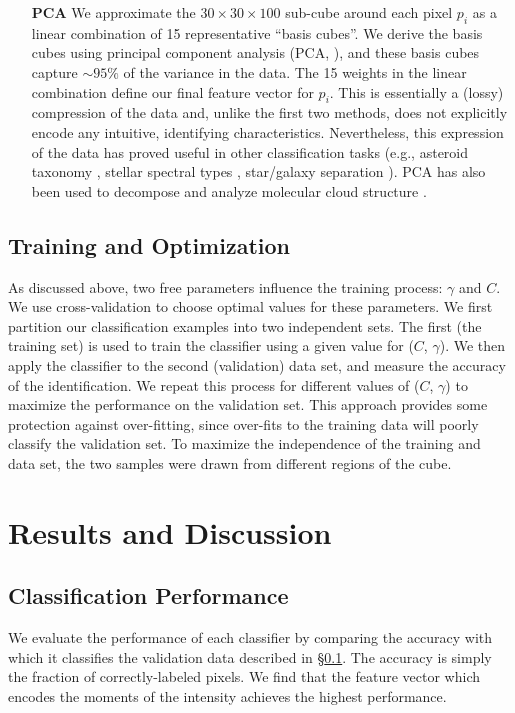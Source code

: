 \begin{enumerate}
\item[\textbf{PCA}] We approximate the $30\times30\times100$ sub-cube around each pixel $p_i$ as a linear combination of 15 representative ``basis cubes''. We derive the basis cubes using principal component analysis (PCA, \citealt{Francis99}), and these basis cubes capture $\sim 95\%$ of the variance in the data. The 15 weights in the linear combination define our final feature vector for $p_i$. This is essentially a (lossy) compression of the data and, unlike the first two methods, does not explicitly encode any intuitive, identifying characteristics. Nevertheless, this expression of the data has proved useful in other classification tasks (e.g., asteroid taxonomy \citep{Tholen84}, stellar spectral types \citep{Singh98}, star/galaxy separation \citep{Cabanac02}). PCA has also been used to decompose and analyze molecular cloud structure \citep{Heyer97, Brunt09}.
\end{enumerate}

\subsection{Training and Optimization}
\label{sec:optimize}
As discussed above, two free parameters influence the training process: $\gamma$ and $C$. We use cross-validation to choose optimal values for these parameters. We first partition our classification examples into two independent sets. The first (the training set) is used to train the classifier using a given value for ($C$, $\gamma$). We then apply the classifier to the second (validation) data set, and measure the accuracy of the identification. We repeat this process for different values of ($C$, $\gamma$) to maximize the performance on the validation set. This approach provides some protection against over-fitting, since over-fits to the training data will poorly classify the validation set. To maximize the independence of the training and data set, the two samples were drawn from different regions of the cube.

\section{Results and Discussion}
\subsection{Classification Performance}
\label{sec:performance}
We evaluate the performance of each classifier by comparing the accuracy with which it classifies the validation data described in \S \ref{sec:optimize}. The accuracy is simply the fraction of correctly-labeled pixels. We find that the feature vector which encodes the moments of the intensity achieves the highest performance.

